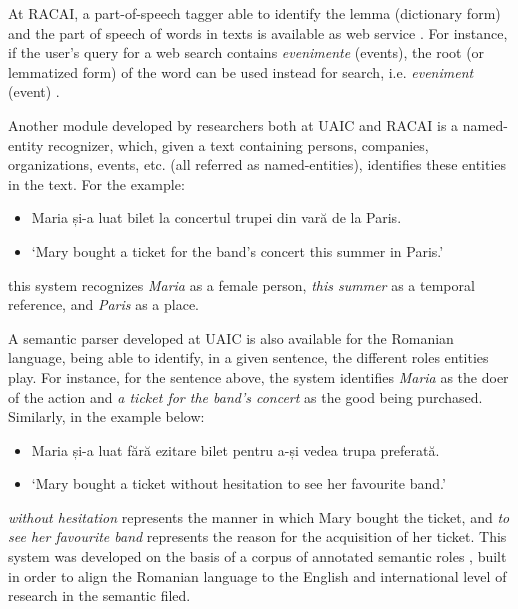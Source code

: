 \documentclass[]{../../metanetpaper}
\begin{document}
\begin{multicols}{2}
At RACAI, a part-of-speech tagger able to identify the lemma (dictionary form) and the part of speech of words in texts is available as web service \cite{webservicesUrl}. For instance, if the user’s query for a web search contains \textit{evenimente} (events), the root (or lemmatized form) of the word can be used instead for search, i.e. \textit{eveniment} (event) \cite{webservicesArt}. 

Another module developed by researchers both at UAIC and RACAI is a named-entity recognizer, which, given a text containing persons, companies, organizations, events, etc. (all referred as named-entities), identifies these entities in the text. For the example:

\begin{example}
\begin{itemize}
\item []Maria și-a luat bilet la concertul trupei din vară de la Paris.
\item []`Mary bought a ticket for the band’s concert this summer in Paris.'
\end{itemize}
\end{example}

\noindent this system recognizes \textit{Maria} as a female person, \textit{this summer} as a temporal reference, and \textit{Paris} as a place.

A semantic parser developed at UAIC \cite{isda} is also available for the Romanian language, being able to identify, in a given sentence, the different roles entities play. For instance, for the sentence above, the system identifies \textit{Maria} as the doer of the action and \textit{a ticket for the band’s concert} as the good being purchased. Similarly, in the example below: 

\begin{example}
\begin{itemize}
\item []Maria și-a luat fără ezitare bilet pentru a-și vedea trupa preferată.
\item []`Mary bought a ticket without hesitation to see her favourite band.'
\end{itemize}
\end{example}

\noindent\textit{without hesitation} represents the manner in which Mary bought the ticket, and \textit{to see her favourite band} represents  the reason for the acquisition of her ticket. This system was developed on the basis of a corpus of annotated semantic roles \cite{trandabat}, built in order to align the Romanian language to the English and international level of research in the semantic filed.


\end{multicols}
\end{document}
